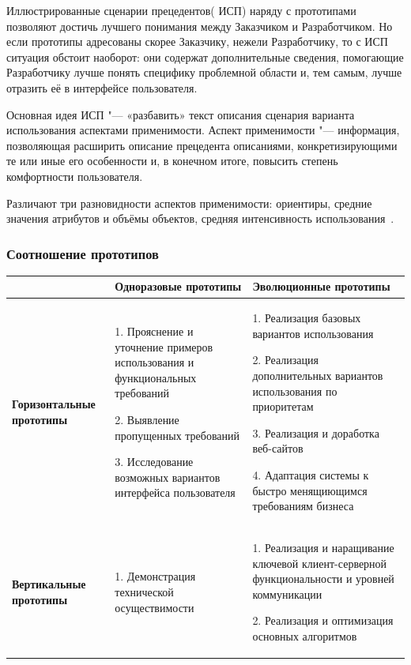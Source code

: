 \documentclass{../industrial-development}
\begin{document}
{Иллюстрированные сценарии прецедентов( ИСП) наряду с прототипами
позволяют достичь лучшего понимания между Заказчиком и Разработчиком. Но если прототипы адресованы скорее Заказчику, нежели Разработчику, то с ИСП ситуация обстоит наоборот: они содержат дополнительные сведения, помогающие Разработчику
лучше понять специфику проблемной области и, тем самым, лучше отразить её в интерфейсе пользователя.

Основная идея ИСП "--- «разбавить» текст описания сценария варианта
использования аспектами применимости.
Аспект применимости "--- информация, позволяющая расширить описание
прецедента описаниями, конкретизирующими те или иные его особенности и, в конечном итоге, повысить степень комфортности пользователя.

Различают три разновидности аспектов применимости: ориентиры, средние значения атрибутов и объёмы объектов, средняя интенсивность использования~\cite[с.~55]{Maglinec}.

\begin{frame} \frametitle {Соотношение прототипов}


\begin{table}[h]
\begin{center}
\begin{tabular}{|p{2cm}|p{}|p{4cm}|}
\hline
 & \tiny \textbf{Одноразовые прототипы} & \tiny \textbf{Эволюционные прототипы} \\
\hline
\tiny \textbf{Горизонтальные прототипы} & 

\tiny{1. Прояснение и уточнение примеров использования и функциональных требований} 

\tiny{2. Выявление пропущенных требований}

\tiny{3. Исследование возможных вариантов интерфейса пользователя}

& \tiny{1. Реализация базовых вариантов использования} 

\tiny{2. Реализация дополнительных вариантов использования по приоритетам}

\tiny{3. Реализация и доработка веб-сайтов}

\tiny{4. Адаптация системы к быстро менящиющимся требованиям бизнеса}
\\
\hline

\tiny \textbf {Вертикальные прототипы} & \tiny{1. Демонстрация технической осуществимости} &
\tiny{1. Реализация и наращивание ключевой клиент-серверной функциональности и уровней коммуникации}

\tiny{2. Реализация и оптимизация основных алгоритмов}


\end{tabular}
\end{center}
\end{table}
\end{frame}}
\end{document}
